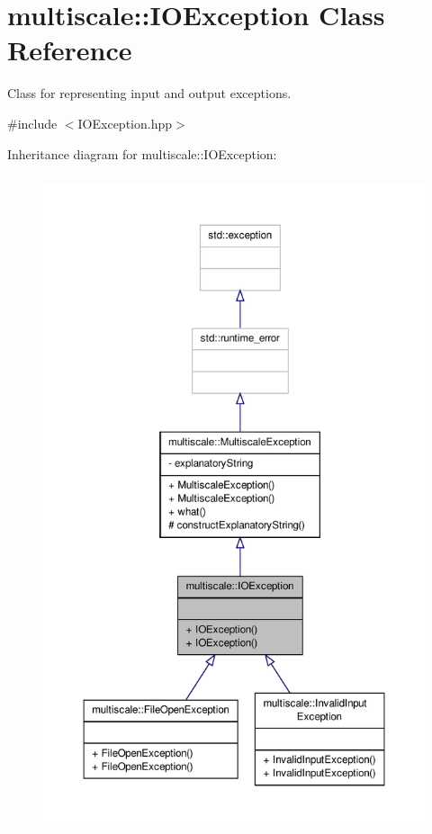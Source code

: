 \hypertarget{classmultiscale_1_1IOException}{\section{multiscale\-:\-:I\-O\-Exception Class Reference}
\label{classmultiscale_1_1IOException}
}


Class for representing input and output exceptions.  




{\ttfamily \#include $<$I\-O\-Exception.\-hpp$>$}



Inheritance diagram for multiscale\-:\-:I\-O\-Exception\-:\nopagebreak
\begin{figure}[H]
\begin{center}
\leavevmode
\includegraphics[height=550pt]{classmultiscale_1_1IOException__inherit__graph}
\end{center}
\end{figure}



